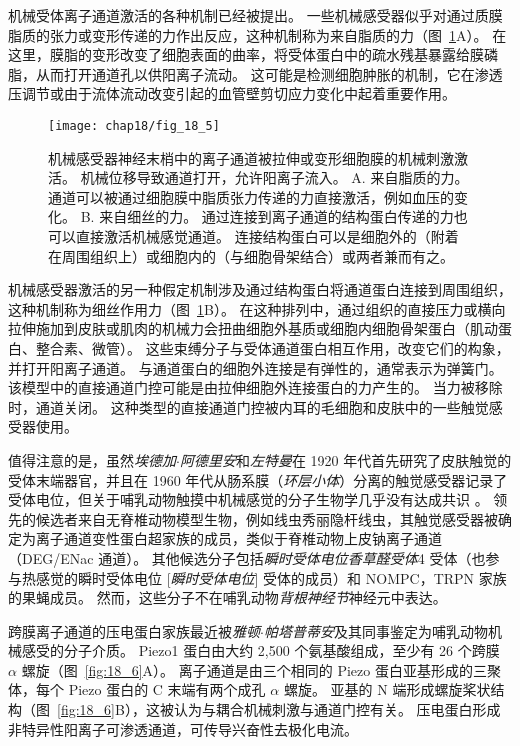 机械受体离子通道激活的各种机制已经被提出。
一些机械感受器似乎对通过质膜脂质的张力或变形传递的力作出反应，这种机制称为来自脂质的力（图~\ref{fig:18_5}A）。
在这里，膜脂的变形改变了细胞表面的曲率，将受体蛋白中的疏水残基暴露给膜磷脂，从而打开通道孔以供阳离子流动。
这可能是检测细胞肿胀的机制，它在渗透压调节或由于流体流动改变引起的血管壁剪切应力变化中起着重要作用。


\begin{figure}[htbp]
	\centering
	\texttt{[image: chap18/fig\_18\_5]}
	\caption{机械感受器神经末梢中的离子通道被拉伸或变形细胞膜的机械刺激激活。
		机械位移导致通道打开，允许阳离子流入\cite{lin2005trp}。
		A. 来自脂质的力。
		通道可以被通过细胞膜中脂质张力传递的力直接激活，例如血压的变化。
		B. 来自细丝的力。
		通过连接到离子通道的结构蛋白传递的力也可以直接激活机械感觉通道。
		连接结构蛋白可以是细胞外的（附着在周围组织上）或细胞内的（与细胞骨架结合）或两者兼而有之。}
	\label{fig:18_5}
\end{figure}


机械感受器激活的另一种假定机制涉及通过结构蛋白将通道蛋白连接到周围组织，这种机制称为细丝作用力（图~\ref{fig:18_5}B）。
在这种排列中，通过组织的直接压力或横向拉伸施加到皮肤或肌肉的机械力会扭曲细胞外基质或细胞内细胞骨架蛋白（肌动蛋白、整合素、微管）。
这些束缚分子与受体通道蛋白相互作用，改变它们的构象，并打开阳离子通道。
与通道蛋白的细胞外连接是有弹性的，通常表示为弹簧门。
该模型中的直接通道门控可能是由拉伸细胞外连接蛋白的力产生的。
当力被移除时，通道关闭。
这种类型的直接通道门控被内耳的毛细胞和皮肤中的一些触觉感受器使用。


值得注意的是，虽然\textit{埃德加$\cdot$阿德里安}和\textit{左特曼}在 1920 年代首先研究了皮肤触觉的受体末端器官，并且在 1960 年代从肠系膜（\textit{环层小体}）分离的触觉感受器记录了受体电位，但关于哺乳动物触摸中机械感觉的分子生物学几乎没有达成共识 。
领先的候选者来自无脊椎动物模型生物，例如线虫秀丽隐杆线虫，其触觉感受器被确定为离子通道变性蛋白超家族的成员，类似于脊椎动物上皮钠离子通道（DEG/ENac 通道）。
其他候选分子包括\textit{瞬时受体电位香草醛受体}4 受体（也参与热感觉的瞬时受体电位 [\textit{瞬时受体电位}] 受体的成员）和 NOMPC，TRPN 家族的果蝇成员。
然而，这些分子不在哺乳动物\textit{背根神经节}神经元中表达。


跨膜离子通道的压电蛋白家族最近被\textit{雅顿$\cdot$帕塔普蒂安}及其同事鉴定为哺乳动物机械感受的分子介质。
Piezo1 蛋白由大约 2,500 个氨基酸组成，至少有 26 个跨膜 $\alpha$ 螺旋（图~\ref{fig:18_6}A）。
离子通道是由三个相同的 Piezo 蛋白亚基形成的三聚体，每个 Piezo 蛋白的 C 末端有两个成孔 $\alpha$ 螺旋。
亚基的 N 端形成螺旋桨状结构（图~\ref{fig:18_6}B），这被认为与耦合机械刺激与通道门控有关。
压电蛋白形成非特异性阳离子可渗透通道，可传导兴奋性去极化电流。


